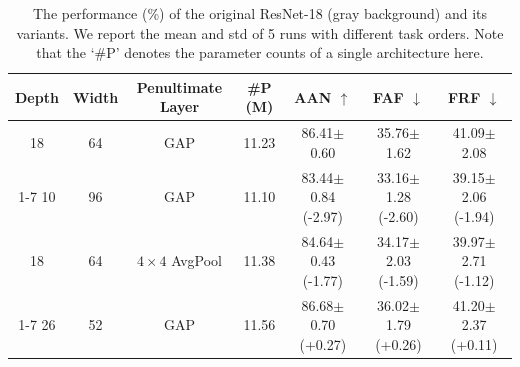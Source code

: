 \usepackage{colortbl}
\usepackage{xcolor}         %
%
%

\begin{table}[ht]
    \caption{The performance (\%) of the original ResNet-18 (gray background) and its variants. We report the mean and std of 5 runs with different task orders. Note that the `\#P' denotes the parameter counts of a single architecture here.}
    \label{tab:evaluation_result}
    \centering
    \begin{tabular}{@{\hspace{2mm}}ccccccc@{\hspace{2mm}}}
        \toprule
        Depth &Width &Penultimate Layer &\#P (M) &AAN $\uparrow$ &FAF $\downarrow$ &FRF $\downarrow$\\
        \midrule
        \rowcolor{black!5}
        18 &64 &GAP &11.23 &86.41$\pm$0.60 &35.76$\pm$1.62 &41.09$\pm$2.08\\
        \cmidrule(lr){1-7}
        10 &96 &GAP &11.10 &83.44$\pm$0.84 (-2.97) &33.16$\pm$1.28 (-2.60) &39.15$\pm$2.06 (-1.94)\\
        18 &64 &$4\times4$ AvgPool &11.38 &84.64$\pm$0.43 (-1.77) &34.17$\pm$2.03 (-1.59) &39.97$\pm$2.71 (-1.12)\\
        \cmidrule(lr){1-7}
        26 &52 &GAP &11.56 &86.68$\pm$0.70 (+0.27) &36.02$\pm$1.79 (+0.26) &41.20$\pm$2.37 (+0.11)\\
        \bottomrule
    \end{tabular}
\end{table}
